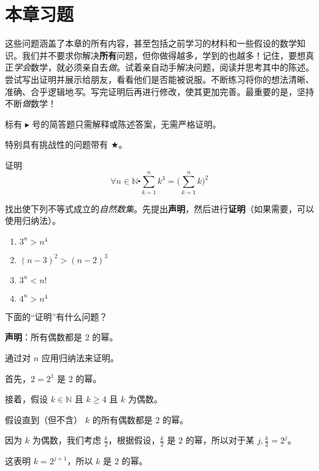 \section{本章习题} \label{sec:section5.7}

这些问题涵盖了本章的所有内容，甚至包括之前学习的材料和一些假设的数学知识。我们并不要求你解决\textbf{所有}问题，但你做得越多，学到的也越多！记住，要想真正\emph{学会}数学，就必须亲自去\emph{做}。试着亲自动手解决问题，阅读并思考其中的陈述。尝试写出证明并展示给朋友，看看他们是否能被说服。不断练习将你的想法清晰、准确、合乎逻辑地\emph{写}。写完证明后再进行修改，使其更加完善。最重要的是，坚持不断\emph{做}数学！

标有 $\blacktriangleright$ 号的简答题只需解释或陈述答案，无需严格证明。

特别具有挑战性的问题带有 $\bigstar$。\\

\begin{exercise} \label{exc:exercises5.7.1}
    证明
    \[\forall n \in \mathbb{N} \centerdot \sum_{k=1}^{n} k^3 = \bigg(\sum_{k=1}^{n} k\bigg)^2\]
\end{exercise}

\begin{exercise}
    找出使下列不等式成立的\emph{自然数集}。先提出\textbf{声明}，然后进行\textbf{证明}（如果需要，可以使用归纳法）。
    \begin{enumerate}[label=(\alph*)]
        \item $3^n > n^4$
        \item $(n-3)^2 > (n-2)^3$
        \item $3^n < n!$
        \item $4^n > n^4$
    \end{enumerate}
\end{exercise}

\begin{exercise}
    下面的``证明''有什么问题？

    \textbf{声明}：所有偶数都是 $2$ 的幂。

    \begin{center}
        \noindent
            \parbox{0.85\textwidth}{%
                \linespread{1.5}\selectfont
                通过对 $n$ 应用归纳法来证明。

                首先，$2=2^1$ 是 $2$ 的幂。

                接着，假设 $k \in \mathbb{N}$ 且 $k \ge 4$ 且 $k$ 为偶数。
                
                假设直到（但不含） $k$ 的所有偶数都是 $2$ 的幂。

                因为 $k$ 为偶数，我们考虑 $\frac{k}{2}$，根据假设，$\frac{k}{2}$ 是 $2$ 的幂，所以对于某 $j, \frac{k}{2}=2^j$。

                这表明 $k = 2^{j+1}$，所以 $k$ 是 $2$ 的幂。 
            }
    \end{center}
\end{exercise}

